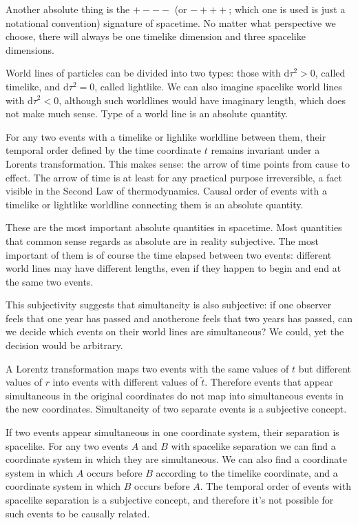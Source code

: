 \documentclass[11pt,oneside%
]{memoir}
\newcommand{\dd}{\mathrm{d}}
\begin{document}
Another absolute thing is the \({+}{-}{-}{-}\) (or \({-}{+}{+}{+}\); which one is used is just a notational convention) signature of spacetime. No matter what perspective we choose, there will always be one timelike dimension and three spacelike dimensions.

World lines of particles can be divided into two types: those with \(\dd\tau^2>0\), called timelike, and \(\dd\tau^2=0\), called lightlike. We can also imagine spacelike world lines with \(\dd\tau^2<0\), although such worldlines would have imaginary length, which does not make much sense. Type of a world line is an absolute quantity.

For any two events with a timelike or lighlike worldline between them, their temporal order defined by the time coordinate \(t\) remains invariant under a Lorents transformation. This makes sense: the arrow of time points from cause to effect. The arrow of time is at least for any practical purpose irreversible, a fact visible in the Second Law of thermodynamics. Causal order of events with a timelike or lightlike worldline connecting them is an absolute quantity.

These are the most important absolute quantities in spacetime. Most quantities that common sense regards as absolute are in reality subjective. The most important of them is of course the time elapsed between two events: different world lines may have different lengths, even if they happen to begin and end at the same two events.

This subjectivity suggests that simultaneity is also subjective: if one observer feels that one year has passed and anotherone feels that two years has passed, can we decide which events on their world lines are simultaneous? We could, yet the decision would be arbitrary.

A Lorentz transformation maps two events with the same values of \(t\) but different values of \(r\) into events with different values of \(\tilde{t}\). Therefore events that appear simultaneous in the original coordinates do not map into simultaneous events in the new coordinates. Simultaneity of two separate events is a subjective concept.

If two events appear simultaneous in one coordinate system, their separation is spacelike. For any two events \(A\) and \(B\) with spacelike separation we can find a coordinate system in which they are simultaneous. We can also find a coordinate system in which \(A\) occurs before \(B\) according to the timelike coordinate, and a coordinate system in which \(B\) occurs before \(A\). The temporal order of events with spacelike separation is a subjective concept, and therefore it's not possible for such events to be causally related.
\end{document}
